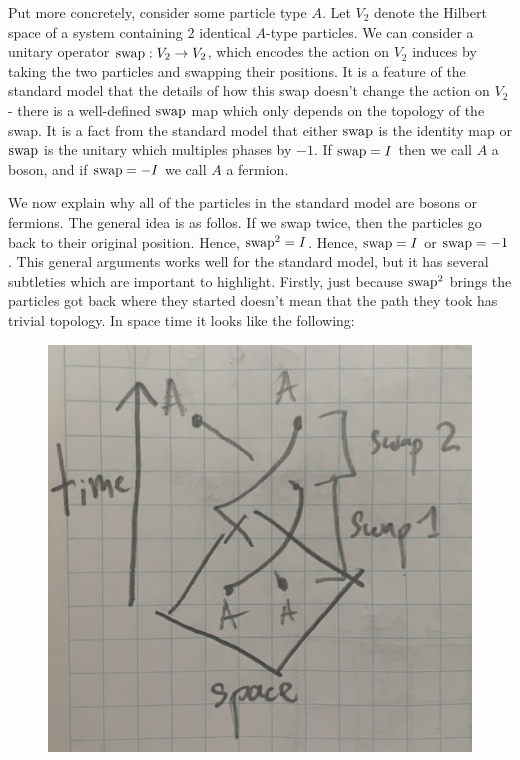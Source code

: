 \documentclass{article}
\theoremstyle{definition}
\numberwithin{figure}{section}
\begin{document}
Put more concretely, consider some particle type $A$. Let $V_2$ denote the Hilbert space of a system containing $2$ identical $A$-type particles. We can consider a unitary operator $\mathrm{swap}:V_2\to V_2$, which encodes the action on $V_2$ induces by taking the two particles and swapping their positions. It is a feature of the standard model that the details of how this swap doesn't change the action on $V_2$ - there is a well-defined $\mathrm{swap}$ map which only depends on the topology of the swap. It is a fact from the standard model that either $\mathrm{swap}$ is the identity map or $\mathrm{swap}$ is the unitary which multiples phases by $-1$. If $\mathrm{swap}=I$ then we call $A$ a boson, and if $\mathrm{swap}=-I$ we call $A$ a fermion.

We now explain why all of the particles in the standard model are bosons or fermions. The general idea is as follos. If we swap twice, then the particles go back to their original position. Hence, $\mathrm{swap}^2=I$. Hence, $\mathrm{swap}=I$ or $\mathrm{swap}=-1$. This general arguments works well for the standard model, but it has several subtleties which are important to highlight. Firstly, just because $\mathrm{swap}^2$ brings the particles got back where they started doesn't mean that the path they took has trivial topology. In space time it looks like the following:

\begin{figure}[h]
\begin{center}
\includegraphics[scale=.04]{two-swaps}
\end{center}
\end{figure}
\end{document}
